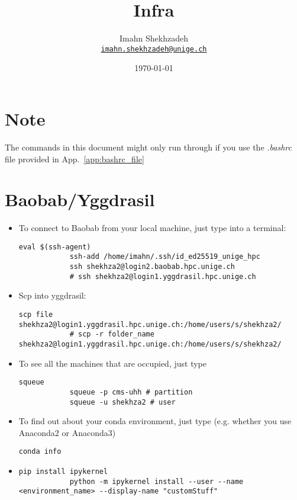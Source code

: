 \documentclass[12pt, a4paper]{article}
\title{Infra}
\author{Imahn Shekhzadeh \\ \texttt{\href{mailto:email@example.com}{imahn.shekhzadeh@unige.ch}}\normalsize}
\date{\today}
\numberwithin{equation}{section}
\theoremstyle{definition}
\theoremstyle{definition}
\begin{document}
	\maketitle 
	\tableofcontents
	
	\section*{\large Note}
	
	The commands in this document might only run through if you use the \textit{.bashrc} file provided in App.~\ref{app:bashrc_file}
	
	\newpage
	
	\section{Baobab/Yggdrasil}
	
	\begin{itemize}
		\item To connect to Baobab from your local machine, just type into a terminal: 
		\begin{lstlisting}[style=mystylebash, label=alg:eval, xleftmargin=\parindent]
			eval $(ssh-agent)
			ssh-add /home/imahn/.ssh/id_ed25519_unige_hpc
			ssh shekhza2@login2.baobab.hpc.unige.ch 
			# ssh shekhza2@login1.yggdrasil.hpc.unige.ch
		\end{lstlisting} 
		
		\item Scp into yggdrasil: 
		\begin{lstlisting}[style=mystylebash, label=alg:scp, xleftmargin=\parindent]
			scp file shekhza2@login1.yggdrasil.hpc.unige.ch:/home/users/s/shekhza2/
			# scp -r folder_name shekhza2@login1.yggdrasil.hpc.unige.ch:/home/users/s/shekhza2/
		\end{lstlisting}
		
		\item To see all the machines that are occupied, just type 
		\begin{lstlisting}[style=mystylebash, label=alg:squeue, caption=Squeue commands, xleftmargin=\parindent]
			squeue
			squeue -p cms-uhh # partition
			squeue -u shekhza2 # user
		\end{lstlisting}
		
		\item To find out about your conda environment, just type (e.g. whether you use Anaconda2 or Anaconda3)
		
		\begin{lstlisting}[style=mystylebash, label=alg:conda_info, xleftmargin=\parindent]
			conda info
		\end{lstlisting}
		
		\item 

		\begin{lstlisting}[style=mystylebash, label=alg:jbn_kernel, xleftmargin=\parindent]
			pip install ipykernel 
			python -m ipykernel install --user --name <environment_name> --display-name "customStuff"
		\end{lstlisting}
	
	\end{itemize}
\end{document}

